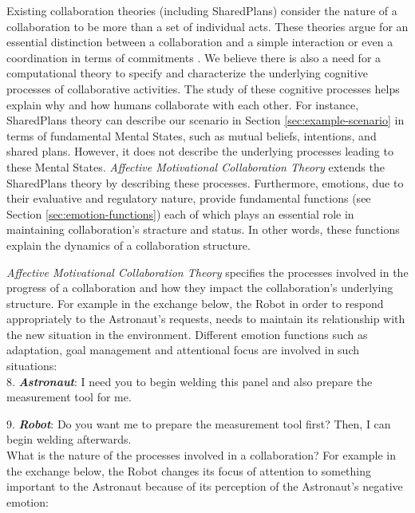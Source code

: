 \documentclass[12pt]{report}
\begin{document}
Existing collaboration theories (including SharedPlans) consider the nature of a
collaboration to be more than a set of individual acts. These theories argue for
an essential distinction between a collaboration and a simple interaction or
even a coordination in terms of commitments \cite{grosz:shared-plans,
lochbaum:collaborative-planning}. We believe there is also a need for a
computational theory to specify and characterize the underlying cognitive
processes of collaborative activities. The study of these cognitive processes
helps explain why and how humans collaborate with each other. For instance,
SharedPlans theory can describe our scenario in Section
\ref{sec:example-scenario} in terms of fundamental Mental States, such as mutual
beliefs, intentions, and shared plans. However, it does not describe the
underlying processes leading to these Mental States. \textit{Affective
Motivational Collaboration Theory} extends the SharedPlans theory by describing
these processes. Furthermore, emotions, due to their evaluative and regulatory
nature, provide fundamental functions (see Section \ref{sec:emotion-functions})
each of which plays an essential role in maintaining collaboration's stracture
and status. In other words, these functions explain the dynamics of a
collaboration structure.

\textit{Affective Motivational Collaboration Theory} specifies the processes
involved in the progress of a collaboration and how they impact the
collaboration's underlying structure. For example in the exchange below, the
Robot in order to respond appropriately to the Astronaut's requests, needs to
maintain its relationship with the new situation in the environment. Different
emotion functions such as adaptation, goal management and attentional focus are
involved in such situations:\\

  8. \textbf{\textit{Astronaut}}: I need you to begin welding this panel and also
  prepare the measurement tool for me.

  9. \textbf{\textit{Robot}}: Do you want me to prepare the measurement tool
  first? Then, I can begin welding afterwards.\\

What is the nature of the processes involved in a collaboration? For example in
the exchange below, the Robot changes its focus of attention to something
important to the Astronaut because of its perception of the Astronaut's negative
emotion:\\
\end{document}
